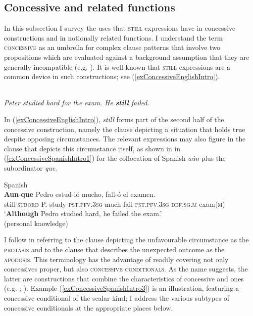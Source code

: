 \subsection{Concessive and related functions}\label{sectionConcessive} 
In this subsection I survey the uses that \textsc{still} expressions have in concessive constructions and in notionally related functions. I understand the term \textsc{concessive} as an umbrella for complex clause patterns that involve two propositions which are evaluated against a background assumption that they are generally incompatible (e.g. \cite{KoenigConcessives}). It is well-known that \textsc{still} expressions are a common device in such constructions; see (\ref{exConcessiveEnglishIntro}).

\begin{exe}
	\ex {}\label{exConcessiveEnglishIntro}\\
	\textit{Peter studied hard for the exam. He \textbf{still} failed.}
\end{exe}

In (\ref{exConcessiveEnglishIntro}), \textit{still} forms part of the second half of the concessive construction, namely the clause depicting a situation that holds true despite opposing circumstances. The relevant expressions may also figure in the clause that depicts this circumstance itself, as shown in in (\ref{exConcessiveSpanishIntro1}) for the collocation of Spanish \textit{aún} plus the subordinator \textit{que}.

\begin{exe}
	\ex Spanish\label{exConcessiveSpanishIntro1}\\
	\gll \textbf{Aun}-\textbf{que} Pedro estud-ió mucho, fall-ó el examen.\\
	still-\textsc{subord} P. study-\textsc{pst}.\textsc{pfv}.3\textsc{sg} much fail-\textsc{pst}.\textsc{pfv}.3\textsc{sg} \textsc{def}.\textsc{sg}.\textsc{m} exam(\textsc{m})\\
	\glt \lq \textbf{Although} Pedro studied hard, he failed the exam.'\\(personal knowledge)
\end{exe}

I follow \textcite[ch. 17]{Croft2022} in referring to the clause depicting the unfavourable circumstance as the \textsc{protasis} and to the clause that describes the unexpected outcome as the \textsc{apodosis}. This terminology has the advantage of readily covering not only concessives proper, but also \textsc{concessive conditionals}. As the name suggests, the latter are constructions that combine the characteristics of concessive and  ones (e.g. \cite{Bossuyt2023}; \cite{HaspelmathKoenig1998}). Example (\ref{exConcessiveSpanishIntro3}) is an illustration, featuring a concessive conditional of the scalar kind; I address the various subtypes of concessive conditionals at the appropriate places below.


